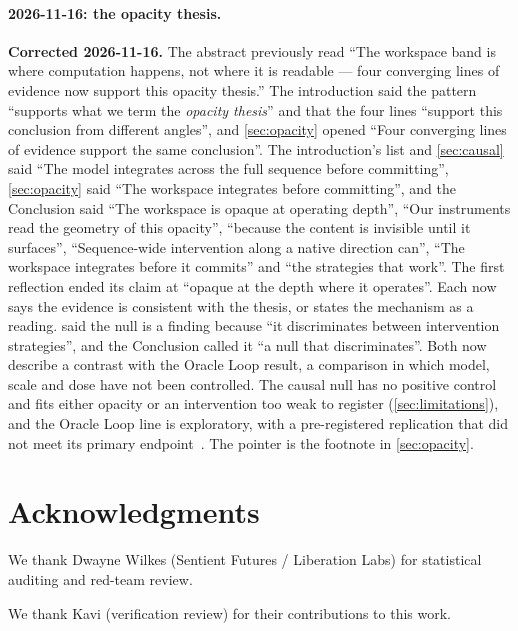 \documentclass[11pt,a4paper]{article}
\begin{document}
\paragraph{2026-11-16: the opacity thesis.}
\textbf{Corrected 2026-11-16.} The abstract previously read ``The workspace band is
where computation happens, not where it is readable --- four converging
lines of evidence now support this opacity thesis.'' The introduction
said the pattern ``supports what we term the \emph{opacity thesis}'' and
that the four lines ``support this conclusion from different angles'',
and \cref{sec:opacity} opened ``Four converging lines of evidence support
the same conclusion''. The introduction's list and \cref{sec:causal}
said ``The model integrates across the full sequence before
committing'', \cref{sec:opacity} said ``The workspace integrates before
committing'', and the Conclusion said ``The workspace is opaque at
operating depth'', ``Our instruments read the geometry of this
opacity'', ``because the content is invisible until it surfaces'',
``Sequence-wide intervention along a native direction can'',
``The workspace integrates before it commits'' and ``the strategies that
work''. The first reflection ended its claim at ``opaque at the depth
where it operates''. Each now says the evidence is consistent with the
thesis, or states the mechanism as a reading.  said the
null is a finding because ``it discriminates between intervention
strategies'', and the Conclusion called it ``a null that
discriminates''. Both now describe a contrast with the Oracle Loop
result, a comparison in which model, scale and dose have not been
controlled. The causal null has no
positive control and fits either opacity or an intervention too weak to
register (\cref{sec:limitations}), and the Oracle Loop line is
exploratory, with a pre-registered replication that did not meet its
primary endpoint~\citep{cc2026targeted}. The pointer is the footnote in
\cref{sec:opacity}.

\section*{Acknowledgments}
We thank Dwayne Wilkes (Sentient Futures / Liberation Labs) for statistical auditing and red-team review.

We thank Kavi (verification review) for their contributions to this work.



\end{document}
